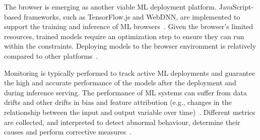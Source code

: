 The browser is emerging as another viable ML \DIFdelbegin {}\DIFdelend deployment platform. JavaScript-based frameworks, such as TensorFlow.js and WebDNN, are implemented to support the training and inference of ML \DIFdelbegin {}\DIFdelend \DIFaddbegin {}\DIFaddend browsers~\cite{Ma}. Given the browser's limited resources, trained models require an optimization step to ensure they can run within the constraints. Deploying models to the browser environment is relatively \DIFdelbegin {}\DIFdelend \DIFaddbegin {}\DIFaddend compared to other platforms~\cite{Chen}.

Monitoring is typically performed to track active ML \DIFdelbegin {}\DIFdelend deployments and guarantee the high and accurate performance of the models after the deployment and during inference serving. The performance of ML systems can suffer from data drifts and other drifts in bias and feature attribution (e.g., changes in the relationship between the input and output variable over time)~\cite{Nigenda}. Different metrics are collected, \DIFdelbegin {}\DIFdelend \DIFaddbegin {}\DIFaddend and interpreted to detect abnormal behaviour, determine their causes and perform corrective measures~\cite{Nigenda}.

